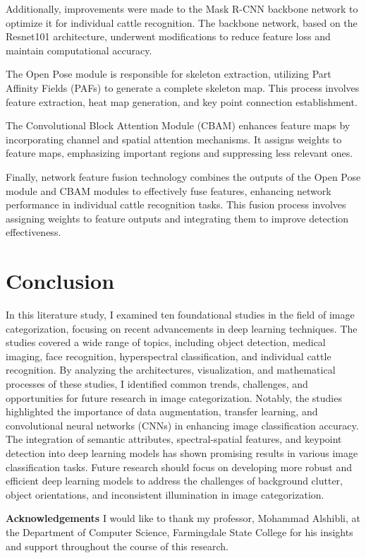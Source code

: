 \documentclass[journal, biblatex]{IEEEtran}
\begin{document}
Additionally, improvements were made to the Mask R-CNN backbone network to optimize it for individual cattle recognition. The backbone network, based on the Resnet101 architecture, underwent modifications to reduce feature loss and maintain computational accuracy.

The Open Pose module is responsible for skeleton extraction, utilizing Part Affinity Fields (PAFs) to generate a complete skeleton map. This process involves feature extraction, heat map generation, and key point connection establishment.

The Convolutional Block Attention Module (CBAM) enhances feature maps by incorporating channel and spatial attention mechanisms. It assigns weights to feature maps, emphasizing important regions and suppressing less relevant ones.

Finally, network feature fusion technology combines the outputs of the Open Pose module and CBAM modules to effectively fuse features, enhancing network performance in individual cattle recognition tasks. This fusion process involves assigning weights to feature outputs and integrating them to improve detection effectiveness.

\section{Conclusion}
In this literature study, I examined ten foundational studies in the field of image categorization, focusing on recent advancements in deep learning techniques. The studies covered a wide range of topics, including object detection, medical imaging, face recognition, hyperspectral classification, and individual cattle recognition. By analyzing the architectures, visualization, and mathematical processes of these studies, I identified common trends, challenges, and opportunities for future research in image categorization. Notably, the studies highlighted the importance of data augmentation, transfer learning, and convolutional neural networks (CNNs) in enhancing image classification accuracy. The integration of semantic attributes, spectral-spatial features, and keypoint detection into deep learning models has shown promising results in various image classification tasks. Future research should focus on developing more robust and efficient deep learning models to address the challenges of background clutter, object orientations, and inconsistent illumination in image categorization.

\textbf{Acknowledgements}
I would like to thank my professor, Mohammad Alshibli, at the Department of Computer Science, Farmingdale State College for his insights and support throughout the course of this research.
\end{document}

